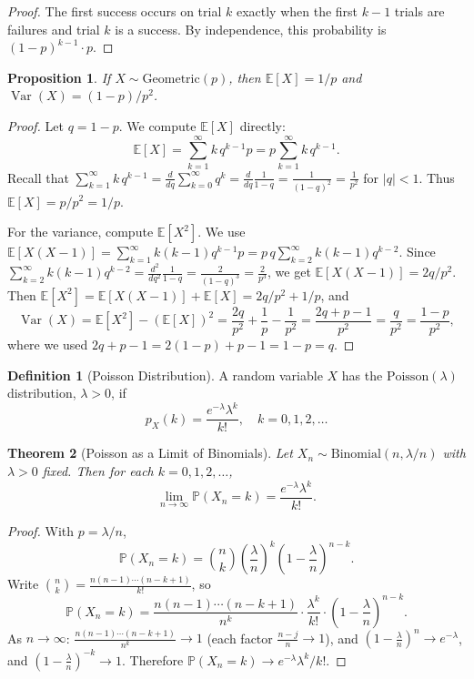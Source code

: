 \documentclass[11pt,a4paper]{article}
\theoremstyle{definition}
\newtheorem{definition}{Definition}[section]
\theoremstyle{plain}
\newtheorem{theorem}{Theorem}[section]
\newtheorem{proposition}[theorem]{Proposition}
\theoremstyle{remark}
\newcommand{\E}{\mathbb{E}}
\newcommand{\Prob}{\mathbb{P}}
\DeclareMathOperator{\Var}{Var}
\begin{document}
\begin{proof}
The first success occurs on trial $k$ exactly when the first $k-1$ trials are failures and
trial $k$ is a success. By independence, this probability is $(1-p)^{k-1} \cdot p$.
\end{proof}

\begin{proposition}
\label{prop:geometric_moments}
If $X \sim \mathrm{Geometric}(p)$, then $\E[X] = 1/p$ and $\Var(X) = (1-p)/p^2$.
\end{proposition}

\begin{proof}
Let $q = 1 - p$. We compute $\E[X]$ directly:
\[
    \E[X] = \sum_{k=1}^\infty k \, q^{k-1} p = p \sum_{k=1}^\infty k \, q^{k-1}.
\]
Recall that $\sum_{k=1}^\infty k \, q^{k-1} = \frac{d}{dq}\sum_{k=0}^\infty q^k
= \frac{d}{dq}\frac{1}{1-q} = \frac{1}{(1-q)^2} = \frac{1}{p^2}$ for $|q| < 1$.
Thus $\E[X] = p/p^2 = 1/p$.

For the variance, compute $\E[X^2]$. We use $\E[X(X-1)] = \sum_{k=1}^\infty k(k-1)q^{k-1}p
= p \, q \sum_{k=2}^\infty k(k-1)q^{k-2}$. Since $\sum_{k=2}^\infty k(k-1)q^{k-2}
= \frac{d^2}{dq^2}\frac{1}{1-q} = \frac{2}{(1-q)^3} = \frac{2}{p^3}$, we get
$\E[X(X-1)] = 2q/p^2$. Then $\E[X^2] = \E[X(X-1)] + \E[X] = 2q/p^2 + 1/p$, and
\[
    \Var(X) = \E[X^2] - (\E[X])^2 = \frac{2q}{p^2} + \frac{1}{p} - \frac{1}{p^2}
    = \frac{2q + p - 1}{p^2} = \frac{q}{p^2} = \frac{1-p}{p^2},
\]
where we used $2q + p - 1 = 2(1-p) + p - 1 = 1 - p = q$.
\end{proof}

\begin{definition}[Poisson Distribution]
\label{def:poisson}
A random variable $X$ has the $\mathrm{Poisson}(\lambda)$ distribution, $\lambda > 0$, if
\[
    p_X(k) = \frac{e^{-\lambda}\lambda^k}{k!}, \quad k = 0, 1, 2, \ldots
\]
\end{definition}

\begin{theorem}[Poisson as a Limit of Binomials]
\label{thm:poisson_limit}
Let $X_n \sim \mathrm{Binomial}(n, \lambda/n)$ with $\lambda > 0$ fixed. Then for each
$k = 0, 1, 2, \ldots$,
\[
    \lim_{n \to \infty} \Prob(X_n = k) = \frac{e^{-\lambda}\lambda^k}{k!}.
\]
\end{theorem}

\begin{proof}
With $p = \lambda/n$,
\[
    \Prob(X_n = k) = \binom{n}{k}\left(\frac{\lambda}{n}\right)^k
    \left(1 - \frac{\lambda}{n}\right)^{n-k}.
\]
Write $\binom{n}{k} = \frac{n(n-1)\cdots(n-k+1)}{k!}$, so
\[
    \Prob(X_n = k) = \frac{n(n-1)\cdots(n-k+1)}{n^k} \cdot \frac{\lambda^k}{k!}
    \cdot \left(1 - \frac{\lambda}{n}\right)^{n-k}.
\]
As $n \to \infty$: $\frac{n(n-1)\cdots(n-k+1)}{n^k} \to 1$ (each factor $\frac{n-j}{n}
\to 1$), and $\left(1 - \frac{\lambda}{n}\right)^n \to e^{-\lambda}$, and
$\left(1 - \frac{\lambda}{n}\right)^{-k} \to 1$. Therefore $\Prob(X_n = k) \to
e^{-\lambda}\lambda^k/k!$.
\end{proof}
\end{document}
